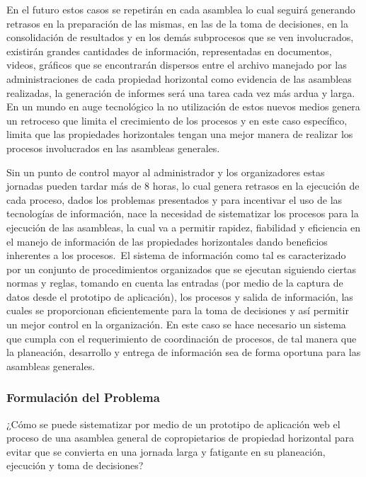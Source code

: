 En el futuro estos casos se repetirán en cada asamblea lo cual seguirá generando retrasos en la preparación de las mismas, en las de la toma de decisiones, en la consolidación de resultados y en los demás subprocesos que se ven involucrados, existirán grandes cantidades de información, representadas en documentos, videos, gráficos que se encontrarán dispersos entre el archivo manejado por las administraciones de cada propiedad horizontal como evidencia de las asambleas realizadas, la generación de informes será una tarea cada vez más ardua y larga. En un mundo en auge tecnológico la no utilización de estos nuevos medios genera un retroceso que limita el crecimiento de los procesos y en este caso específico, limita que las propiedades horizontales tengan una mejor manera de realizar los procesos involucrados en las asambleas generales.

Sin un punto de control mayor al administrador y los organizadores estas jornadas pueden tardar más de 8 horas, lo cual genera retrasos en la ejecución de cada proceso, dados los problemas presentados y para incentivar el uso de las tecnologías de información, nace la necesidad de sistematizar los procesos para la ejecución de las asambleas, la cual va a permitir rapidez, fiabilidad y eficiencia en el manejo de información de las propiedades horizontales dando beneficios inherentes a los procesos.\ 
El sistema de información como tal es caracterizado por un conjunto de procedimientos organizados que se ejecutan siguiendo ciertas normas y reglas, tomando en cuenta las entradas (por medio de la captura de datos desde el prototipo de aplicación), los procesos y salida de información, las cuales se proporcionan eficientemente para la toma de decisiones y así permitir un mejor control en la organización. En este caso se hace necesario un sistema que cumpla con el requerimiento de coordinación de procesos, de tal manera que la planeación, desarrollo y entrega de información sea de forma oportuna para las asambleas generales.

\subsubsection{Formulación del Problema}

¿Cómo se puede sistematizar por medio de un prototipo de aplicación web el proceso de una asamblea general de copropietarios de propiedad horizontal para evitar que se convierta en una jornada larga y fatigante en su planeación, ejecución y toma de decisiones?


